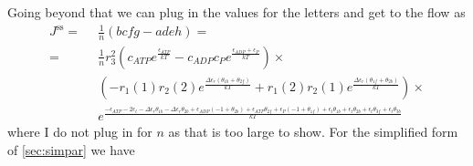 \documentclass[11pt]{article}
\begin{document}
Going beyond that we can plug in the values for the letters and get to the flow as
\begin{align}
	J^\text{ss} =\enspace & \frac{1}{n}(bcfg-adeh) = \nonumber                                                                                                                                                                                                                                                                                                                                            \\
	=\enspace             & \frac{1}{n} r_3^{2} \left( c_{ATP} e^{\frac{\epsilon_{ATP}}{kT}} - c_{ADP} c_P e^{\frac{\epsilon_{ADP} + \epsilon_P}{kT}} \right) \times \nonumber                                                                                                                                                                                                                            \\
	                      & \left(  - r_{1}(1) r_{2}(2) e^{\frac{\Delta\epsilon_{r} \left( \theta_{1b} + \theta_{2f} \right)}{kT}} + r_{1}(2) r_{2}(1) e^{\frac{\Delta\epsilon_{r} \left( \theta_{1f} + \theta_{2b} \right)}{kT}} \right) \times \nonumber                                                                                                                                                \\
	                      & e^{\frac{ - \epsilon_{ATP} - 2 \epsilon_{t} - \Delta\epsilon_{r} \theta_{1b} - \Delta\epsilon_{r} \theta_{2b} + \epsilon_{ADP} \left( -1 + \theta_{2b} \right) + \epsilon_{ATP} \theta_{2f} + \epsilon_P \left( -1 + \theta_{1f} \right) + \epsilon_{t} \theta_{1b} + \epsilon_{t} \theta_{2b} + \epsilon_{t} \theta_{3f} + \epsilon_{t} \theta_{3b}}{kT}} \label{eq:N1sscur}
\end{align}
where I do not plug in for $n$ as that is too large to show. For the simplified form of \cref{sec:simpar} we have
\end{document}
